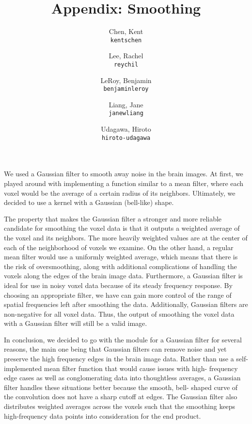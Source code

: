 \documentclass[11pt]{article}
\title{Appendix: Smoothing}
\author{
  Chen, Kent\\
  \texttt{kentschen}
  \and
  Lee, Rachel\\
  \texttt{reychil}
  \and
  LeRoy, Benjamin\\
  \texttt{benjaminleroy}
  \and
  Liang, Jane\\
  \texttt{janewliang}
  \and
  Udagawa, Hiroto\\
  \texttt{hiroto-udagawa}
}
\begin{document}
\maketitle

\par \indent We used a Gaussian filter to smooth away noise in the brain 
images. At first, we played around with implementing a function similar 
to a mean filter, where each voxel would be the average of a certain radius 
of its neighbors. Ultimately, we decided to use a kernel with a Gaussian 
(bell-like) shape. 

\par The property that makes the Gaussian filter a stronger and more 
reliable candidate for smoothing the voxel data is that it outputs a weighted 
average of the voxel and its neighbors. The more heavily weighted values are 
at the center of each of the neighborhood of voxels we examine. On the other 
hand, a regular mean filter would use a uniformly weighted average, which 
means that there is the risk of oversmoothing, along with additional 
complications of handling the voxels along the edges of the brain image data. 
Furthermore, a Gaussian filter is ideal for use in noisy voxel data because of 
its steady frequency response. By choosing an appropriate filter, we have can 
gain more control of the range of spatial frequencies left after smoothing 
the data. Additionally, Gaussian filters are non-negative for all voxel data. 
Thus, the output of smoothing the voxel data with a Gaussian filter will still 
be a valid image. 

\par In conclusion, we decided to go with the module for a Gaussian filter for 
several reasons, the main one being that Gaussian filters can remove noise and 
yet preserve the high frequency edges in the brain image data. Rather than use 
a self-implemented mean filter function that would cause issues with high-
frequency edge cases as well as conglomerating data into thoughtless averages, 
a Gaussian filter handles these situations better because the smooth, bell-
shaped curve of the convolution does not have a sharp cutoff at edges. The 
Gaussian filter also distributes weighted averages across the voxels such that 
the smoothing keeps high-frequency data points into consideration for the end 
product.


\end{document}
